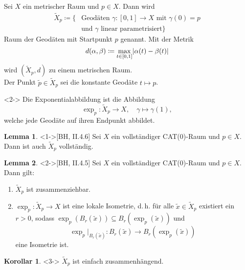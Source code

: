 \documentclass{beamer}
\newcommand{\I}{\left[0,1\right]} %
\renewcommand{\emph}[1]{\textcolor{Emph}{#1}}
\DeclarePairedDelimiter\abs{\lvert}{\rvert}%
\theoremstyle{definition}
\newtheorem*{lem}{Lemma}
\newtheorem*{kor}{Korollar}
\begin{document}
\begin{frame}
  \begin{definition}
    Sei $X$ ein metrischer Raum und $p \in X$. Dann wird
    \begin{align*}
      \tilde{X}_p \coloneqq \{ &\text{Geodäten } \gamma : \I \to X \text{ mit } \gamma(0) = p\\
      &\text{und $\gamma$ linear parametrisiert} \}
    \end{align*}
    \emph{Raum der Geodäten mit Startpunkt $p$} genannt. Mit der Metrik
    \[ d(\alpha, \beta) \coloneqq \max_{t \in \I} \abs{\alpha(t) - \beta(t)} \]
    wird $(\tilde{X}_p, d)$ zu einem metrischen Raum.\\
    Der Punkt $\tilde{p} \in \tilde{X}_p$ sei die konstante Geodäte $t \mapsto p$.
  \end{definition}

  \begin{definition}<2->
    Die \emph{Exponentialabbildung} ist die Abbildung
    \[ \exp_p : \tilde{X}_p \to X, \quad \gamma \mapsto \gamma(1), \]
    welche jede Geodäte auf ihren Endpunkt abbildet.
  \end{definition}
\end{frame}

\begin{frame}
  \begin{lem}<1->[BH, II.4.6]
    Sei $X$ ein vollständiger CAT($0$)-Raum und $p \in X$. Dann ist auch $\tilde{X}_p$ vollständig.
  \end{lem}

  \begin{lem}<2->[BH, II.4.5]
    Sei $X$ ein vollständiger CAT($0$)-Raum und $p \in X$. Dann gilt:
    \begin{enumerate}
      \item $\tilde{X}_p$ ist zusammenziehbar.
      \item $\exp_p : \tilde{X}_p \to X$ ist eine lokale Isometrie, d.\,h. für alle $\tilde{x} \in \tilde{X}_p$ existiert ein $r > 0$, sodass $\exp_p(B_r(\tilde{x})) \subseteq B_r(\exp_p(\tilde{x}))$ und
      \[ \exp_p|_{B_r(\tilde{x})} : B_r(\tilde{x}) \to B_r(\exp_p(\tilde{x})) \]
      eine Isometrie ist.
    \end{enumerate}
  \end{lem}

  \begin{kor}<3->
    $\tilde{X}_p$ ist einfach zusammenhängend.
  \end{kor}
\end{frame}
\end{document}
